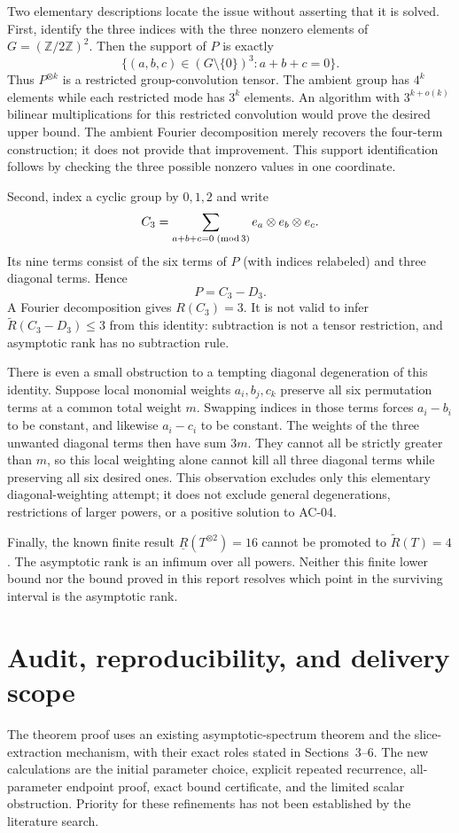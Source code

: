 \documentclass[11pt]{article}
\newcommand{\AR}{\widetilde{R}}
\newcommand{\BR}{\underline{R}}
\theoremstyle{definition}\newtheorem{definition}[theorem]{Definition}
\theoremstyle{remark}\newtheorem{remark}[theorem]{Remark}
\begin{document}
Two elementary descriptions locate the issue without asserting that it is
solved. First, identify the three indices with the three nonzero elements of
$G=(\mathbb Z/2\mathbb Z)^2$. Then the support of $P$ is exactly
\[
\{(a,b,c)\in(G\setminus\{0\})^3:a+b+c=0\}.
\]
Thus $P^{\otimes k}$ is a restricted group-convolution tensor. The ambient group
has $4^k$ elements while each restricted mode has $3^k$ elements. An algorithm
with $3^{k+o(k)}$ bilinear multiplications for this restricted convolution would
prove the desired upper bound. The ambient Fourier decomposition merely
recovers the four-term construction; it does not provide that improvement.
This support identification follows by checking the three possible nonzero
values in one coordinate.

Second, index a cyclic group by $0,1,2$ and write
\[
C_3=\sum_{a+b+c=0\;({\rm mod}\,3)}e_a\otimes e_b\otimes e_c.
\]
Its nine terms consist of the six terms of $P$ (with indices relabeled) and
three diagonal terms. Hence
\[
P=C_3-D_3.
\]
A Fourier decomposition gives $R(C_3)=3$. It is not valid to infer
$\AR(C_3-D_3)\leq3$ from this identity: subtraction is not a tensor restriction,
and asymptotic rank has no subtraction rule.

There is even a small obstruction to a tempting diagonal degeneration of
this identity. Suppose local monomial weights $a_i,b_j,c_k$ preserve all six
permutation terms at a common total weight $m$. Swapping indices in those
terms forces $a_i-b_i$ to be constant, and likewise $a_i-c_i$ to be constant.
The weights of the three unwanted diagonal terms then have sum $3m$.
They cannot all be strictly greater than $m$, so this local weighting alone
cannot kill all three diagonal terms while preserving all six desired ones.
This observation excludes only this elementary diagonal-weighting attempt;
it does not exclude general degenerations, restrictions of larger powers,
or a positive solution to AC-04.

Finally, the known finite result $\BR(T^{\otimes2})=16$ \cite{conner} cannot
be promoted to $\AR(T)=4$. The asymptotic rank is an infimum over all powers.
Neither this finite lower bound nor the bound proved in this report resolves
which point in the surviving interval is the asymptotic rank.

\section{Audit, reproducibility, and delivery scope}
The theorem proof uses an existing asymptotic-spectrum theorem and the
slice-extraction mechanism, with their exact roles stated in
Sections~3--6. The new calculations are the initial parameter choice,
explicit repeated recurrence, all-parameter endpoint proof, exact bound
certificate, and the limited scalar obstruction. Priority for these refinements
has not been established by the literature search.
\end{document}
